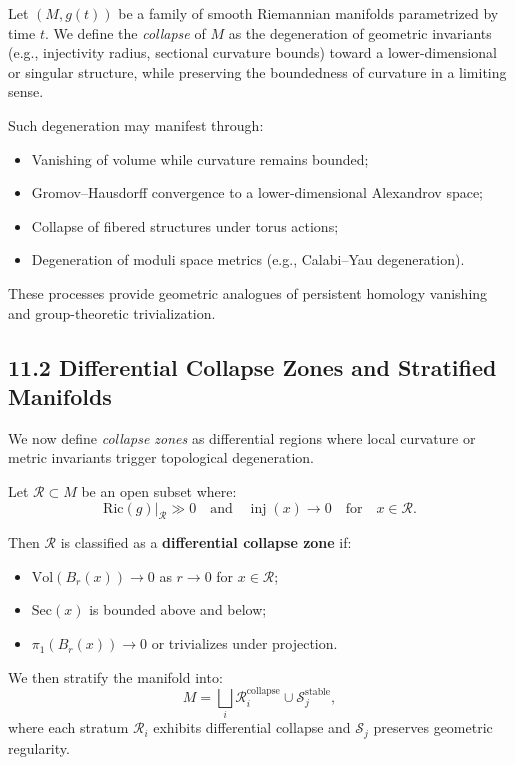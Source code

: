 \documentclass[11pt]{article}
\begin{document}
Let \( (M, g(t)) \) be a family of smooth Riemannian manifolds parametrized by time \( t \). We define the \emph{collapse} of \( M \) as the degeneration of geometric invariants (e.g., injectivity radius, sectional curvature bounds) toward a lower-dimensional or singular structure, while preserving the boundedness of curvature in a limiting sense.

Such degeneration may manifest through:
\begin{itemize}
    \item Vanishing of volume while curvature remains bounded;
    \item Gromov–Hausdorff convergence to a lower-dimensional Alexandrov space;
    \item Collapse of fibered structures under torus actions;
    \item Degeneration of moduli space metrics (e.g., Calabi–Yau degeneration).
\end{itemize}

These processes provide geometric analogues of persistent homology vanishing and group-theoretic trivialization.

\subsection*{11.2 Differential Collapse Zones and Stratified Manifolds}

We now define \emph{collapse zones} as differential regions where local curvature or metric invariants trigger topological degeneration.

Let \( \mathcal{R} \subset M \) be an open subset where:
\[
\mathrm{Ric}(g)|_{\mathcal{R}} \gg 0 \quad \text{and} \quad \operatorname{inj}(x) \to 0 \quad \text{for} \quad x \in \mathcal{R}.
\]

Then \( \mathcal{R} \) is classified as a \textbf{differential collapse zone} if:
\begin{itemize}
    \item \( \mathrm{Vol}(B_r(x)) \to 0 \) as \( r \to 0 \) for \( x \in \mathcal{R} \);
    \item \( \mathrm{Sec}(x) \) is bounded above and below;
    \item \( \pi_1(B_r(x)) \to 0 \) or trivializes under projection.
\end{itemize}

We then stratify the manifold into:
\[
M = \bigsqcup_i \mathcal{R}_i^{\text{collapse}} \cup \mathcal{S}_j^{\text{stable}},
\]
where each stratum \( \mathcal{R}_i \) exhibits differential collapse and \( \mathcal{S}_j \) preserves geometric regularity.
\end{document}
